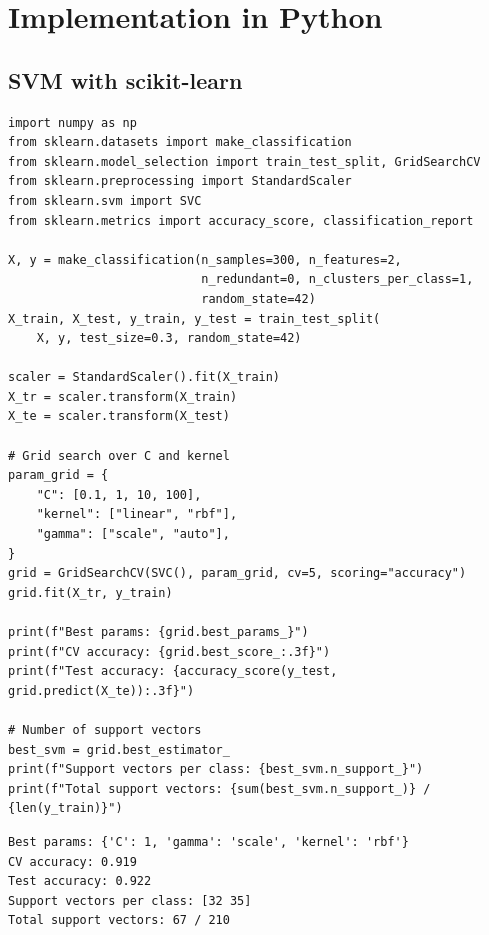 \section{Implementation in Python}

\subsection{SVM with scikit-learn}

\begin{codeblock}[title=\textbf{SVM Classification with scikit-learn}]
\begin{verbatim}
import numpy as np
from sklearn.datasets import make_classification
from sklearn.model_selection import train_test_split, GridSearchCV
from sklearn.preprocessing import StandardScaler
from sklearn.svm import SVC
from sklearn.metrics import accuracy_score, classification_report

X, y = make_classification(n_samples=300, n_features=2,
                           n_redundant=0, n_clusters_per_class=1,
                           random_state=42)
X_train, X_test, y_train, y_test = train_test_split(
    X, y, test_size=0.3, random_state=42)

scaler = StandardScaler().fit(X_train)
X_tr = scaler.transform(X_train)
X_te = scaler.transform(X_test)

# Grid search over C and kernel
param_grid = {
    "C": [0.1, 1, 10, 100],
    "kernel": ["linear", "rbf"],
    "gamma": ["scale", "auto"],
}
grid = GridSearchCV(SVC(), param_grid, cv=5, scoring="accuracy")
grid.fit(X_tr, y_train)

print(f"Best params: {grid.best_params_}")
print(f"CV accuracy: {grid.best_score_:.3f}")
print(f"Test accuracy: {accuracy_score(y_test, grid.predict(X_te)):.3f}")

# Number of support vectors
best_svm = grid.best_estimator_
print(f"Support vectors per class: {best_svm.n_support_}")
print(f"Total support vectors: {sum(best_svm.n_support_)} / {len(y_train)}")
\end{verbatim}
\end{codeblock}

\begin{codeoutput}
\begin{verbatim}
Best params: {'C': 1, 'gamma': 'scale', 'kernel': 'rbf'}
CV accuracy: 0.919
Test accuracy: 0.922
Support vectors per class: [32 35]
Total support vectors: 67 / 210
\end{verbatim}
\end{codeoutput}

